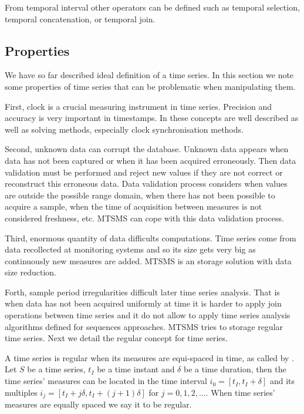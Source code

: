 From temporal interval other operators can be defined such as temporal
selection, temporal concatenation, or temporal join.




\subsection{Properties}
\label{sec:model:properties}

We have so far described ideal definition of a time series. In this
section we note some properties of time series that can be problematic
when manipulating them.

First, clock is a crucial measuring instrument in time
series. Precision and accuracy is very important in timestamps.  In
\cite{kopetz11:realtime} these concepts are well described as well as
solving methods, especially clock synchronisation methods.


Second, unknown data can corrupt the database. Unknown data appears
when data has not been captured or when it has been acquired
erroneously. Then data validation must be performed and reject new
values if they are not correct or reconstruct this erroneous data.
Data validation process considers when values are outside the possible
range domain, when there has not been possible to acquire a sample,
when the time of acquisition between measures is not considered
freshness, etc. MTSMS can cope with this data validation process.


Third, enormous quantity of data difficults computations.  Time series
come from data recollected at monitoring systems and so its size gets
very big as continuously new measures are added.  MTSMS is an storage
solution with data size reduction.



Forth, sample period irregularities difficult later time series
analysis. That is when data has not been acquired uniformly at time it
is harder to apply join operations between time series and it do not
allow to apply time series analysis algorithms defined for sequences
approaches.  MTSMS tries to storage regular time series.  Next we
detail the regular concept for time series.


A time series is regular when its measures are equi-spaced in time, as
called by \textcite{last:hetland}. Let $S$ be a time series, $t_I$ be a
time instant and $\delta$ be a time duration, then the time series'
measures can be located in the time interval $i_0=[t_I, t_I+\delta]$ and
its multiples $i_j=[t_I+j\delta, t_I+(j+1)\delta]$ for
$j=0,1,2,\ldots$. When time series' measures are equally spaced we say
it to be regular.

